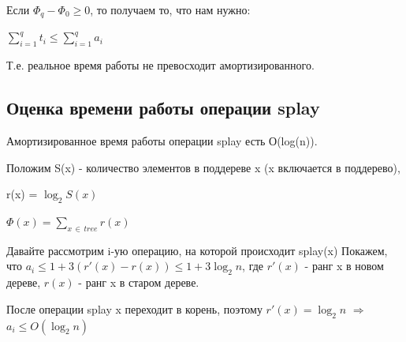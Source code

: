 Если $\Phi_q - \Phi_0 \geq 0$, то получаем то, что нам нужно:

$\displaystyle\sum_{i=1}^{q} t_i \leq \displaystyle\sum_{i=1}^{q} a_i$ 

Т.е. реальное время работы не превосходит амортизированного.

\subsection*{Оценка времени работы операции splay}
\Th Амортизированное время работы операции  splay есть О(log(n)).

\Proof Положим S(x) - количество элементов в поддереве x (x  включается в поддерево),

r(x) = $\log_{2}{S(x)}$

$\Phi(x) = \displaystyle\sum_{x\,\in\,tree} r(x)$

Давайте рассмотрим i-ую операцию, на которой происходит splay(x)
Покажем, что $a_i \leq 1 + 3( r'(x) - r(x)) \leq 1 + 3\log_{2}{n}$, где $r'(x)$ - ранг x  в новом дереве, $r(x)$ - ранг x  в старом дереве.

После операции splay x переходит в корень, поэтому $r'(x) = \log_{2}{n}$ $\Longrightarrow$ $a_i \leq O(\log_{2}{n})$

